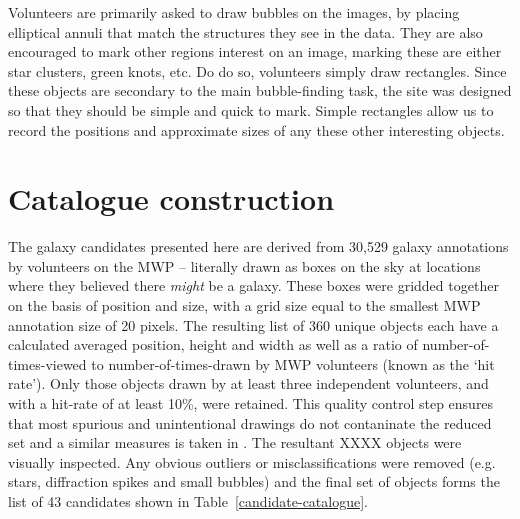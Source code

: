 \documentclass[times,usenatbib]{mn2e}
\begin{document}
Volunteers are primarily asked to draw bubbles on the images, by placing elliptical annuli that match the structures they see in the data. They are also encouraged to mark other regions interest on an image, marking these are either star clusters, green knots, etc. Do do so, volunteers simply draw rectangles. Since these objects are secondary to the main bubble-finding task, the site was designed so that they should be simple and quick to mark. Simple rectangles allow us to record the positions and approximate sizes of any these other interesting objects.

\section{Catalogue construction}

The galaxy candidates presented here are derived from 30,529 galaxy annotations by volunteers on the MWP -- literally drawn as boxes on the sky at locations where they believed there \emph{might} be a galaxy. These boxes were gridded together on the basis of position and size, with a grid size equal to the smallest MWP annotation size of 20 pixels. The resulting list of 360 unique objects each have a calculated averaged position, height and width as well as a ratio of number-of-times-viewed to number-of-times-drawn by MWP volunteers (known as the `hit rate'). Only those objects drawn by at least three independent volunteers, and with a hit-rate of at least 10\%, were retained. This quality control step ensures that most spurious and unintentional drawings do not contaninate the reduced set and a similar measures is taken in \citet{Simpson+12}. The resultant XXXX objects were visually inspected. Any obvious outliers or misclassifications were removed (e.g. stars, diffraction spikes and small bubbles) and the final set of objects forms the list of 43 candidates shown in Table~\ref{candidate-catalogue}.
\end{document}

